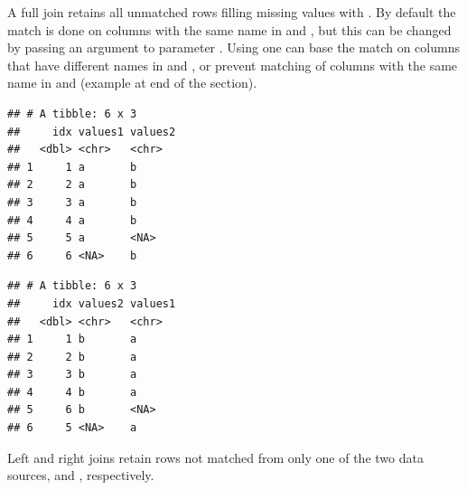 \documentclass[krantz2]{krantz}\usepackage{knitr}%
\begin{document}
A full join retains all unmatched rows filling missing values with . By default the match is done on columns with the same name in  and , but this can be changed by passing an argument to parameter . Using  one can base the match on columns that have different names in  and , or prevent matching of columns with the same name in  and  (example at end of the section).

\begin{knitrout}\footnotesize
{}\color{fgcolor}\begin{kframe}
\begin{alltt}
\hlstd{(}   
\end{alltt}


{\ttfamily\noindent\itshape{}}\begin{verbatim}
## # A tibble: 6 x 3
##     idx values1 values2
##   <dbl> <chr>   <chr>  
## 1     1 a       b      
## 2     2 a       b      
## 3     3 a       b      
## 4     4 a       b      
## 5     5 a       <NA>   
## 6     6 <NA>    b
\end{verbatim}
\end{kframe}
\end{knitrout}

\begin{knitrout}\footnotesize
{}\color{fgcolor}\begin{kframe}
\begin{alltt}
\hlstd{(}   
\end{alltt}


{\ttfamily\noindent\itshape{}}\begin{verbatim}
## # A tibble: 6 x 3
##     idx values2 values1
##   <dbl> <chr>   <chr>  
## 1     1 b       a      
## 2     2 b       a      
## 3     3 b       a      
## 4     4 b       a      
## 5     6 b       <NA>   
## 6     5 <NA>    a
\end{verbatim}
\end{kframe}
\end{knitrout}

Left and right joins retain rows not matched from only one of the two data sources,  and , respectively.
\end{document}
